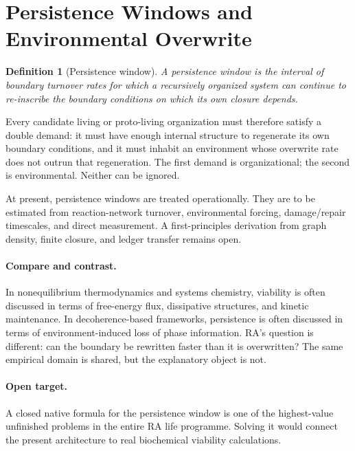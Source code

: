 \documentclass[11pt]{article}
\newtheorem{definition}{Definition}
\begin{document}
\section{Persistence Windows and Environmental Overwrite}
\label{sec:persistence}

\begin{definition}[Persistence window]
A \emph{persistence window} is the interval of boundary turnover rates for which a recursively organized system can continue to re-inscribe the boundary conditions on which its own closure depends.
\end{definition}

Every candidate living or proto-living organization must therefore satisfy a double demand: it must have enough internal structure to regenerate its own boundary conditions, and it must inhabit an environment whose overwrite rate does not outrun that regeneration. The first demand is organizational; the second is environmental. Neither can be ignored.

At present, persistence windows are treated operationally. They are to be estimated from reaction-network turnover, environmental forcing, damage/repair timescales, and direct measurement. A first-principles derivation from graph density, finite closure, and ledger transfer remains open.

\paragraph{Compare and contrast.} In nonequilibrium thermodynamics and systems chemistry, viability is often discussed in terms of free-energy flux, dissipative structures, and kinetic maintenance. In decoherence-based frameworks, persistence is often discussed in terms of environment-induced loss of phase information. RA's question is different: can the boundary be rewritten faster than it is overwritten? The same empirical domain is shared, but the explanatory object is not.

\paragraph{Open target.} A closed native formula for the persistence window is one of the highest-value unfinished problems in the entire RA life programme. Solving it would connect the present architecture to real biochemical viability calculations.
\end{document}
